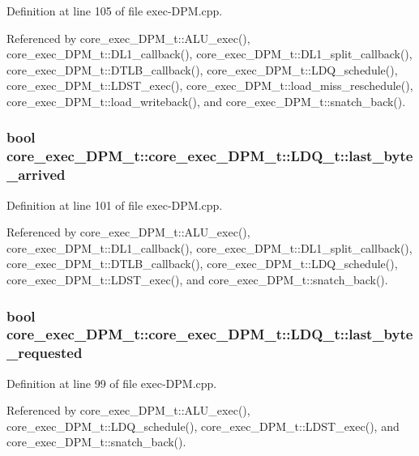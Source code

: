Definition at line 105 of file exec-DPM.cpp.

Referenced by core\_\-exec\_\-DPM\_\-t::ALU\_\-exec(), core\_\-exec\_\-DPM\_\-t::DL1\_\-callback(), core\_\-exec\_\-DPM\_\-t::DL1\_\-split\_\-callback(), core\_\-exec\_\-DPM\_\-t::DTLB\_\-callback(), core\_\-exec\_\-DPM\_\-t::LDQ\_\-schedule(), core\_\-exec\_\-DPM\_\-t::LDST\_\-exec(), core\_\-exec\_\-DPM\_\-t::load\_\-miss\_\-reschedule(), core\_\-exec\_\-DPM\_\-t::load\_\-writeback(), and core\_\-exec\_\-DPM\_\-t::snatch\_\-back().
\subsubsection[{last\_\-byte\_\-arrived}]{\setlength{\rightskip}{0pt plus 5cm}bool core\_\-exec\_\-DPM\_\-t::core\_\-exec\_\-DPM\_\-t::LDQ\_\-t::last\_\-byte\_\-arrived}\label{structcore__exec__DPM__t_1_1LDQ__t_79f4c6395a8df5be7f0414d7e035be77}




Definition at line 101 of file exec-DPM.cpp.

Referenced by core\_\-exec\_\-DPM\_\-t::ALU\_\-exec(), core\_\-exec\_\-DPM\_\-t::DL1\_\-callback(), core\_\-exec\_\-DPM\_\-t::DL1\_\-split\_\-callback(), core\_\-exec\_\-DPM\_\-t::DTLB\_\-callback(), core\_\-exec\_\-DPM\_\-t::LDQ\_\-schedule(), core\_\-exec\_\-DPM\_\-t::LDST\_\-exec(), and core\_\-exec\_\-DPM\_\-t::snatch\_\-back().
\subsubsection[{last\_\-byte\_\-requested}]{\setlength{\rightskip}{0pt plus 5cm}bool core\_\-exec\_\-DPM\_\-t::core\_\-exec\_\-DPM\_\-t::LDQ\_\-t::last\_\-byte\_\-requested}\label{structcore__exec__DPM__t_1_1LDQ__t_a6b521d057414fe8ea6ed3bed4e51e22}




Definition at line 99 of file exec-DPM.cpp.

Referenced by core\_\-exec\_\-DPM\_\-t::ALU\_\-exec(), core\_\-exec\_\-DPM\_\-t::LDQ\_\-schedule(), core\_\-exec\_\-DPM\_\-t::LDST\_\-exec(), and core\_\-exec\_\-DPM\_\-t::snatch\_\-back().

